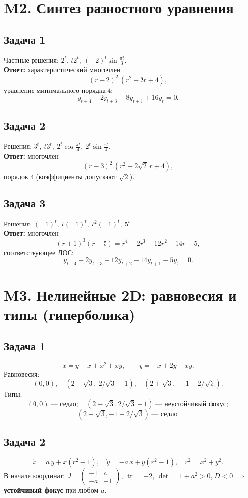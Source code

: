 \documentclass[12pt]{article}
\begin{document}
\section*{M2. Синтез разностного уравнения}

\subsection*{Задача 1}
Частные решения: $2^t,\ t2^t,\ (-2)^t\sin\frac{\pi t}{3}$. \\
\textbf{Ответ: } характеристический многочлен
\[
(r-2)^2\,(r^2+2r+4),
\]
уравнение минимального порядка $4$:
\[
y_{t+4}-2y_{t+3}-8y_{t+1}+16y_t=0.
\]

\subsection*{Задача 2}
Решения: $3^t,\ t3^t,\ 2^t\cos\frac{\pi t}{4},\ 2^t\sin\frac{\pi t}{4}$.\\
\textbf{Ответ: } многочлен
\[
(r-3)^2\,(r^2-2\sqrt2\,r+4),
\]
порядок $4$ (коэффициенты допускают $\sqrt2$).

\subsection*{Задача 3}
Решения: $(-1)^t,\ t(-1)^t,\ t^2(-1)^t,\ 5^t$.\\
\textbf{Ответ: } многочлен
\[
(r+1)^3(r-5)=r^4-2r^3-12r^2-14r-5,
\]
соответствующее ЛОС:
\[
y_{t+4}-2y_{t+3}-12y_{t+2}-14y_{t+1}-5y_t=0.
\]

\section*{M3. Нелинейные 2D: равновесия и типы (гиперболика)}

\subsection*{Задача 1}
\[
\dot x=y-x+x^2+xy,\qquad \dot y=-x+2y-xy.
\]
Равновесия: 
\[
(0,0),\quad (2-\sqrt3,\ 2/\sqrt3-1),\quad (2+\sqrt3,\ -1-2/\sqrt3).
\]
Типы:
\[
(0,0)\ \text{--- седло};\quad
(2-\sqrt3,2/\sqrt3-1)\ \text{--- неустойчивый фокус};
\]
\[
(2+\sqrt3,-1-2/\sqrt3)\ \text{--- седло}.
\]

\subsection*{Задача 2}
\[
\dot x=a\,y+x(r^2-1),\quad \dot y=-a\,x+y(r^2-1),\quad r^2=x^2+y^2.
\]
В начале координат: $J=\begin{pmatrix}-1&a\\-a&-1\end{pmatrix}$,
$\operatorname{tr}=-2$, $\det=1+a^2>0$, $D<0$ $\Rightarrow$ \textbf{устойчивый фокус} при любом $a$.
\end{document}
